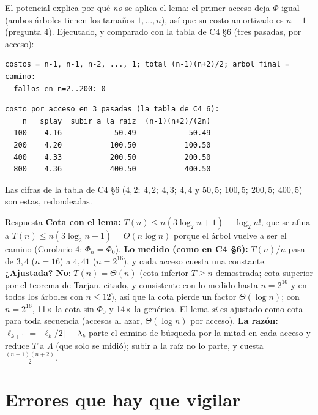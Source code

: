 \documentclass[11pt]{article}
\begin{document}
El potencial explica por qué \emph{no} se aplica el lema: el primer acceso deja $\Phi$ igual (ambos árboles tienen los tamaños $1,\dots,n$), así que su costo amortizado es $n-1$ (pregunta 4).
Ejecutado, y comparado con la tabla de C4 §6 (tres pasadas, por acceso):
\begin{lstlisting}[style=salida,basicstyle=\ttfamily\footnotesize\color{black},columns=fixed]
costos = n-1, n-1, n-2, ..., 1; total (n-1)(n+2)/2; arbol final = camino:
  fallos en n=2..200: 0
\end{lstlisting}
\begin{lstlisting}[style=salida,basicstyle=\ttfamily\footnotesize\color{black},columns=fixed]
costo por acceso en 3 pasadas (la tabla de C4 6):
    n   splay  subir a la raiz  (n-1)(n+2)/(2n)
  100    4.16            50.49            50.49
  200    4.20           100.50           100.50
  400    4.33           200.50           200.50
  800    4.36           400.50           400.50
\end{lstlisting}
Las cifras de la tabla de C4 §6 ($4{,}2;\ 4{,}2;\ 4{,}3;\ 4{,}4$ y $50{,}5;\ 100{,}5;\ 200{,}5;\ 400{,}5$) son estas, redondeadas.

\begin{resultado}{Respuesta}
\textbf{Cota con el lema:} $T(n)\le n(3\log_2n+1)+\log_2n!$, que se afina a $T(n)\le n(3\log_2n+1)=O(n\log n)$ porque el árbol vuelve a ser el camino
(Corolario 4: $\Phi_n=\Phi_0$). \textbf{Lo medido (como en C4 §6):} $T(n)/n$ pasa de $3{,}4$ ($n=16$) a $4{,}41$ ($n=2^{16}$), y
cada acceso cuesta una constante. \textbf{¿Ajustada?} \textbf{No}: $T(n)=\Theta(n)$ (cota inferior $T\ge n$ demostrada; cota superior por el teorema de Tarjan, citado, y consistente
con lo medido hasta $n=2^{16}$ y en todos los árboles con $n\le12$), así que la cota pierde un factor $\Theta(\log n)$; con $n=2^{16}$, 11$\times$ la cota sin $\Phi_0$ y 14$\times$ la genérica. El lema \emph{sí} es ajustado como cota para toda secuencia
(accesos al azar, $\Theta(\log n)$ por acceso). \textbf{La razón:} $\ell_{k+1}=\lfloor\ell_k/2\rfloor+\lambda_k$ parte el camino de búsqueda por la mitad en cada acceso y reduce $T$ a $\Lambda$ (que solo se midió); subir a la raíz no lo parte,
y cuesta $\tfrac{(n-1)(n+2)}{2}$.
\end{resultado}

\section*{Errores que hay que vigilar}
\end{document}
